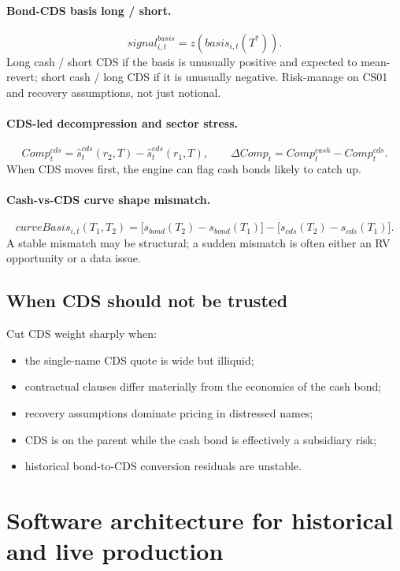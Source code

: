 \documentclass[11pt]{article}
\begin{document}
\paragraph{Bond-CDS basis long / short.}
\[
signal^{basis}_{i,t}=z\!\left(basis_{i,t}(T^\ast)\right).
\]
Long cash / short CDS if the basis is unusually positive and expected to mean-revert; short cash / long CDS if it is unusually negative. Risk-manage on CS01 and recovery assumptions, not just notional.

\paragraph{CDS-led decompression and sector stress.}
\[
Comp^{cds}_t=\hat s^{cds}_t(r_2,T)-\hat s^{cds}_t(r_1,T),
\qquad
\Delta Comp_t = Comp^{cash}_t - Comp^{cds}_t.
\]
When CDS moves first, the engine can flag cash bonds likely to catch up.

\paragraph{Cash-vs-CDS curve shape mismatch.}
\[
curveBasis_{i,t}(T_1,T_2)
=
\bigl[s_{bond}(T_2)-s_{bond}(T_1)\bigr]
-
\bigl[s_{cds}(T_2)-s_{cds}(T_1)\bigr].
\]
A stable mismatch may be structural; a sudden mismatch is often either an RV opportunity or a data issue.

\subsection{When CDS should not be trusted}

Cut CDS weight sharply when:
\begin{itemize}
    \item the single-name CDS quote is wide but illiquid;
    \item contractual clauses differ materially from the economics of the cash bond;
    \item recovery assumptions dominate pricing in distressed names;
    \item CDS is on the parent while the cash bond is effectively a subsidiary risk;
    \item historical bond-to-CDS conversion residuals are unstable.
\end{itemize}

\section{Software architecture for historical and live production}
\end{document}
